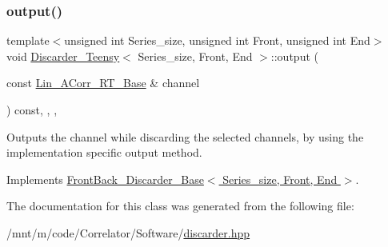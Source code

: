 \subsubsection{\texorpdfstring{output()}{output()}}
{\footnotesize\ttfamily template$<$unsigned int Series\+\_\+size, unsigned int Front, unsigned int End$>$ \\
void \hyperlink{classDiscarder__Teensy}{Discarder\+\_\+\+Teensy}$<$ Series\+\_\+size, Front, End $>$\+::output (\begin{DoxyParamCaption}\item[{const \hyperlink{classLin__ACorr__RT__Base}{Lin\+\_\+\+A\+Corr\+\_\+\+R\+T\+\_\+\+Base} \&}]{channel }\end{DoxyParamCaption}) const\hspace{0.3cm}{\ttfamily [inline]}, {\ttfamily [override]}, {\ttfamily [private]}, {\ttfamily [virtual]}}



Outputs the channel while discarding the selected channels, by using the implementation specific output method. 



Implements \hyperlink{classFrontBack__Discarder__Base_ab8a1d0082f223c31da3c1374c520c4c4}{Front\+Back\+\_\+\+Discarder\+\_\+\+Base$<$ Series\+\_\+size, Front, End $>$}.



The documentation for this class was generated from the following file\+:\begin{DoxyCompactItemize}
\item 
/mnt/m/code/\+Correlator/\+Software/\hyperlink{discarder_8hpp}{discarder.\+hpp}\end{DoxyCompactItemize}
